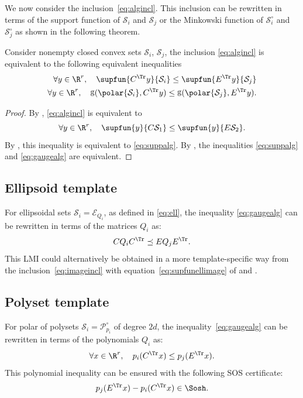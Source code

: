\documentclass[11pt,twoside,a4paper,openright]{uclouvain-thesis}
\DeclareMathOperator{\gauge}{g}
\newcommand{\polyset}[1][p]{\mathcal{P}_{#1}}
\begin{document}
We now consider the inclusion~\eqref{eq:algincl}.
This inclusion can be rewritten in terms of the support
function of $\mathcal{S}_i$ and $\mathcal{S}_j$ or the Minkowski function of $\mathcal{S}_i^\circ$ and $\mathcal{S}_j^\circ$
as shown in the following theorem.
\begin{mytheo}
  \label{theo:controlineq}
  Consider nonempty closed convex sets $\mathcal{S}_i$, $\mathcal{S}_j$,
  the inclusion \eqref{eq:algincl} is equivalent to the following
  equivalent inequalities
  \begin{align}
    \label{eq:suppalg}
    \forall y \in \R^r, \quad \supfun{C^\Tr y}{\mathcal{S}_i} \le \supfun{E^\Tr y}{\mathcal{S}_j}\\
    \label{eq:gaugealg}
    \forall y \in \R^r, \quad \gauge(\polar{\mathcal{S}_i}, C^\Tr y) \le \gauge(\polar{\mathcal{S}_j}, E^\Tr y).
  \end{align}
  \begin{proof}
    By , \eqref{eq:algincl} is equivalent to
    \[ \forall y \in \R^r, \quad \supfun{y}{C \mathcal{S}_1} \le \supfun{y}{E \mathcal{S}_2}. \]
    By , this inequality is equivalent to \eqref{eq:suppalg}.
    By , the inequalities \eqref{eq:suppalg} and \eqref{eq:gaugealg} are equivalent.
  \end{proof}
\end{mytheo}

\subsection{Ellipsoid template}
For ellipsoidal sets $\mathcal{S}_i = \mathcal{E}_{Q_i}$, as defined in \eqref{eq:ell}, the inequality \eqref{eq:gaugealg}
can be rewritten in terms of the matrices $Q_i$ as:
\begin{equation}
  \label{eq:ellalgincl}
  C Q_i C^\Tr \preceq E Q_j E^\Tr.
\end{equation}
This LMI could alternatively be obtained in a more template-specific way from the inclusion~\eqref{eq:imageincl}
with equation~\eqref{eq:supfunellimage} of  and .

\subsection{Polyset template}
For polar of polysets $\mathcal{S}_i = \polyset[p_i]^\circ$ of degree $2d$,
the inequality~\eqref{eq:gaugealg}
can be rewritten in terms of the polynomials $Q_i$ as:
\begin{equation*}
  \forall x \in \R^r, \quad p_i(C^\Tr x) \le p_j(E^\Tr x).
\end{equation*}
This polynomial inequality can be ensured with the following SOS certificate:
\begin{equation*}
  p_j(E^\Tr x) - p_i(C^\Tr x) \in \Sosh.
\end{equation*}
\end{document}
